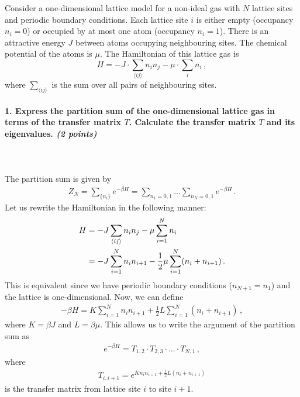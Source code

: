 Consider a one-dimensional lattice model for a 
non-ideal gas with $N$ lattice sites and 
periodic boundary conditions. Each lattice 
site $i$ is either empty (occupancy $n_i=0$) 
or occupied by at most one atom (occupancy 
$n_i=1$). There is an attractive energy $J$ 
between atoms occupying neighbouring sites.
The chemical potential of the atoms is $\mu$. 
The Hamiltonian of this lattice gas is
\begin{equation}
    H=-J\cdot\sum_{\langle ij\rangle}n_in_j
    -\mu\cdot\sum_in_i \,,
\end{equation}
where $\sum_{\langle ij\rangle}$ is the sum 
over all pairs of neighbouring sites.

\paragraph{1. Express the partition sum of the 
    one-dimensional lattice gas in terms of 
    the transfer matrix $T$.  Calculate the 
    transfer matrix $T$ and its eigenvalues. 
    \textit{(2 points)}
} \ \\
\\
The partition sum is given by
\begin{align}
	Z_N = \sum_{\{n_i\}} e^{-\beta H} = 
	\sum_{n_1=0,1} ... \sum_{n_N=0,1} e^{-\beta H} \,.
\end{align}
Let us rewrite the Hamiltonian in the following manner:
\begin{align}
	H &= - J \sum_{\langle ij\rangle} n_i n_j 
	- \mu \sum_{i=1}^{N} n_i \notag \\
	&= - J \sum_{i=1}^{N} n_i n_{i+1} - 
	\frac{1}{2} \mu \sum_{i=1}^{N} (n_i + n_{i+1}) \,.
\end{align}
This is equivalent since we have periodic boundary conditions 
($n_{N+1}=n_1$) and the lattice is one-dimensional. 
Now, we can define
\begin{align}
	-\beta H = K \sum_{i=1}^{N} n_i n_{i+1} 
	+ \frac{1}{2} L \sum_{i=1}^{N} (n_i + n_{i+1}) \,,
\end{align}
where $K = \beta J$ and $L = \beta \mu$. 
This allows us to write the argument of the partition sum as
\begin{align}
	e^{-\beta H} = T_{1,2} \cdot T_{2,3} \cdot ... \cdot  T_{N,1} \,,
\end{align}
where 
\begin{align}
	T_{i,i+1} = e^{K n_i n_{i+1} + \frac{1}{2} L (n_i + n_{i+1})}
\end{align}
is the transfer matrix from lattice site $i$ to site $i+1$. 
